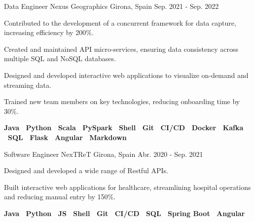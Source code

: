 \begin{cventries}
      \cventry
      {Data Engineer} %
      {Nexus Geographics} %
      {Girona, Spain} %
      {Sep. 2021 - Sep. 2022} %
      {
        \begin{cvitems}
        \item {Contributed to the development of a concurrent framework for data capture, increasing efficiency by 200\%.}
        \item {Created and maintained API micro-services, ensuring data consistency across multiple SQL and NoSQL databases.}
        \item {Designed and developed interactive web applications to visualize
          on-demand and streaming data.}
        \item {Trained new team members on key technologies, reducing onboarding time by 30\%.}
        \item {
          \textbf{
            Java \textbar \
            Python \textbar \
            Scala \textbar \
            PySpark \textbar \
            Shell \textbar \
            Git \textbar \
            CI/CD \textbar \
            Docker \textbar \
            Kafka \textbar \
            SQL \textbar \
            Flask \textbar \
            Angular \textbar \
            Markdown
         }
        }
        \end{cvitems}
      }


      \cventry
      {Software Engineer} %
      {NexTReT} %
      {Girona, Spain} %
      {Abr. 2020 - Sep. 2021} %
      {
        \begin{cvitems}
        \item {Designed and developed a wide range of Restful APIs.}
        \item {Built interactive web applications for healthcare, streamlining hospital operations and reducing manual entry by 150\%.}
        \item {
          \textbf{
            Java \textbar \
            Python \textbar \
            JS \textbar \
            Shell \textbar \
            Git \textbar \
            CI/CD \textbar \
            SQL \textbar \
            Spring Boot \textbar \
            Angular
         }
        }
        \end{cvitems}
      }

  \end{cventries}
